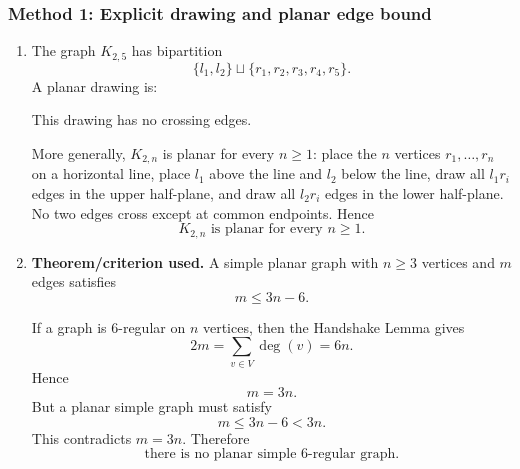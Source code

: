 \documentclass[12pt]{article}
\begin{document}
\subsubsection{Method 1: Explicit drawing and planar edge bound}
\begin{enumerate}[label=(\alph*)]
  \item The graph $K_{2,5}$ has bipartition
  \[
    \{l_1,l_2\}\sqcup \{r_1,r_2,r_3,r_4,r_5\}.
  \]
  A planar drawing is:
  \begin{center}
  \end{center}
  This drawing has no crossing edges.

  More generally, $K_{2,n}$ is planar for every $n\ge 1$: place the $n$ vertices $r_1,\dots,r_n$ on a horizontal line, place $l_1$ above the line and $l_2$ below the line, draw all $l_1r_i$ edges in the upper half-plane, and draw all $l_2r_i$ edges in the lower half-plane. No two edges cross except at common endpoints. Hence
  \[
    \boxed{K_{2,n}\text{ is planar for every }n\ge 1.}
  \]

  \item \textbf{Theorem/criterion used.} A simple planar graph with $n\ge 3$ vertices and $m$ edges satisfies
  \[
    m\le 3n-6.
  \]

  If a graph is $6$-regular on $n$ vertices, then the Handshake Lemma gives
  \[
    2m=\sum_{v\in V}\deg(v)=6n.
  \]
  Hence
  \[
    m=3n.
  \]
  But a planar simple graph must satisfy
  \[
    m\le 3n-6<3n.
  \]
  This contradicts $m=3n$. Therefore
  \[
    \boxed{\text{there is no planar simple }6\text{-regular graph}.}
  \]
\end{enumerate}
\end{document}
